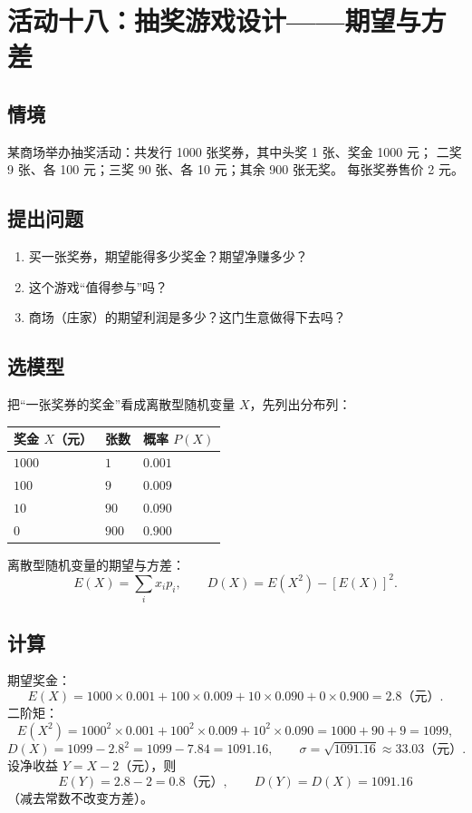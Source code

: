 \section{活动十八：抽奖游戏设计——期望与方差}

\subsection{情境}
某商场举办抽奖活动：共发行 1000 张奖券，其中头奖 1 张、奖金 1000 元；
二奖 9 张、各 100 元；三奖 90 张、各 10 元；其余 900 张无奖。
每张奖券售价 2 元。

\subsection{提出问题}
\begin{enumerate}
  \item 买一张奖券，期望能得多少奖金？期望净赚多少？
  \item 这个游戏“值得参与”吗？
  \item 商场（庄家）的期望利润是多少？这门生意做得下去吗？
\end{enumerate}

\subsection{选模型}
把“一张奖券的奖金”看成离散型随机变量 $X$，先列出分布列：
\begin{center}
\footnotesize
\setlength{\tabcolsep}{4pt}
\renewcommand{\arraystretch}{1.4}
\begin{tabular}{p{2.6cm}p{2.6cm}p{3.2cm}}
\toprule
奖金 $X$（元） & 张数 & 概率 $P(X)$ \\
\midrule
$1000$ & $1$ & $0.001$ \\
$100$ & $9$ & $0.009$ \\
$10$ & $90$ & $0.090$ \\
$0$ & $900$ & $0.900$ \\
\bottomrule
\end{tabular}
\end{center}
离散型随机变量的期望与方差：
\[
  E(X)=\sum_i x_ip_i,\qquad D(X)=E(X^2)-[E(X)]^2.
\]

\subsection{计算}
期望奖金：
\[
  E(X)=1000\times0.001+100\times0.009+10\times0.090+0\times0.900=2.8\text{（元）}.
\]
二阶矩：
\[
  E(X^2)=1000^2\times0.001+100^2\times0.009+10^2\times0.090=1000+90+9=1099,
\]
\[
  D(X)=1099-2.8^2=1099-7.84=1091.16,\qquad \sigma=\sqrt{1091.16}\approx33.03\text{（元）}.
\]
设净收益 $Y=X-2$（元），则
\[
  E(Y)=2.8-2=0.8\text{（元）},\qquad D(Y)=D(X)=1091.16
\]
（减去常数不改变方差）。

